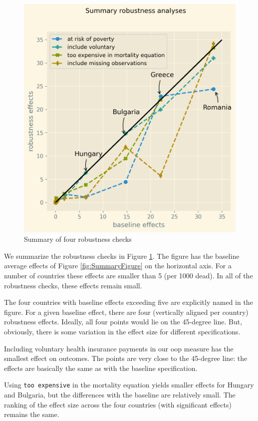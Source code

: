 \documentclass[a4paper,12pt]{article}
\begin{document}
\begin{figure}[htbp]
\centering
\includegraphics[width=.9\linewidth]{./figures/robustness_summary.png}
\caption{\label{fig:robustness_summary}Summary of four robustness checks}
\end{figure}

We summarize the robustness checks in Figure \ref{fig:robustness_summary}. The figure has the baseline average effects of Figure \ref{fig:SummaryFigure} on the horizontal axis. For a number of countries these effects are smaller than 5 (per 1000 dead). In all of the robustness checks, these effects remain small.

The four countries with baseline effects exceeding five are explicitly named in the figure. For a given baseline effect, there are four (vertically aligned per country) robustness effects. Ideally, all four points would lie on the 45-degree line. But, obviously, there is some variation in the effect size for different specifications.

Including voluntary health insurance payments in our oop measure has the smallest effect on outcomes. The points are very close to the 45-degree line: the effects are basically the same as with the baseline specification.

Using \texttt{too expensive} in the mortality equation yields smaller effects for Hungary and Bulgaria, but the differences with the baseline are relatively small. The ranking of the effect size across the four countries (with significant effects) remains the same.
\end{document}
